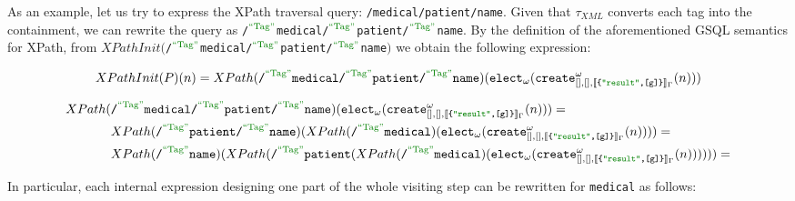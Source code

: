 \begin{example}
As an example, let us try to express the XPath traversal query: \texttt{/medical/patient/name}. Given that $\tau_{XML}$ converts each tag into the  containment, we can rewrite the query as \texttt{/}$^{\mstr{Tag}}$\texttt{medical/}$^{\mstr{Tag}}$\texttt{patient/}$^{\mstr{Tag}}$\texttt{name}. By the definition of the aforementioned GSQL semantics for XPath, from $XPathInit($\texttt{/}$^{\mstr{Tag}}$\texttt{medical/}$^{\mstr{Tag}}$\texttt{patient/}$^{\mstr{Tag}}$\texttt{name}$)$ we obtain the following expression:
\medskip

\hspace*{-1.5cm}\vbox{\[XPathInit(P)(n) = XPath(\texttt{/}^{\mstr{Tag}}\texttt{medical/}^{\mstr{Tag}}\texttt{patient/}^{\mstr{Tag}}\texttt{name}) (\texttt{elect}_\omega(\texttt{create}^\omega_{[],[],\jsem{\texttt{\{\mstr{result},[g]\}}}_\Gamma}(n)))\]}
\medskip

\hspace*{-2cm}\vbox{\[\begin{split}
XPath(&\texttt{/}^{\mstr{Tag}}\texttt{medical/}^{\mstr{Tag}}\texttt{patient/}^{\mstr{Tag}}\texttt{name})(\texttt{elect}_\omega(\texttt{create}^\omega_{[],[],\jsem{\texttt{\{\mstr{result},[g]\}}}_\Gamma}(n)))=\\
	&XPath(\texttt{/}^{\mstr{Tag}}\texttt{patient/}^{\mstr{Tag}}\texttt{name})(XPath(\texttt{/}^{\mstr{Tag}}\texttt{medical})(\texttt{elect}_\omega(\texttt{create}^\omega_{[],[],\jsem{\texttt{\{\mstr{result},[g]\}}}_\Gamma}(n))))=\\
	&XPath(\texttt{/}^{\mstr{Tag}}\texttt{name})(XPath(\texttt{/}^{\mstr{Tag}}\texttt{patient}(XPath(\texttt{/}^{\mstr{Tag}}\texttt{medical})(\texttt{elect}_\omega(\texttt{create}^\omega_{[],[],\jsem{\texttt{\{\mstr{result},[g]\}}}_\Gamma}(n))))))=\\
\end{split}\]}
\medskip

In particular, each internal expression designing one part of the whole visiting step can be rewritten for \texttt{medical} as follows:


\end{example}
